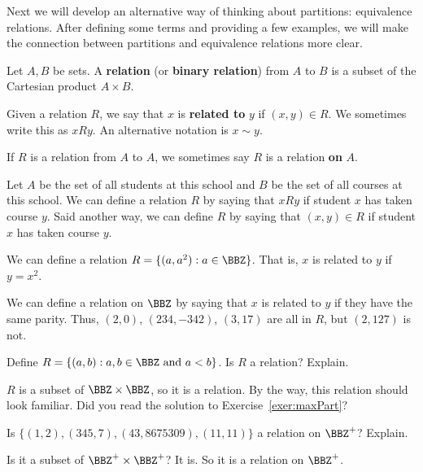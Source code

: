 Next we will develop an alternative way of thinking about partitions: equivalence relations.
After defining some terms and providing a few examples, we will make the connection between
partitions and equivalence relations more clear.
 
\begin{df}
Let $A, B$ be sets. A {\bf relation} (or {\bf binary relation}) 
from $A$ to $B$ is a subset of the Cartesian product $A\times B$.

Given a relation $R$, we say that $x$ is {\bf related to} $y$ 
if $(x, y)\in R$.  We sometimes write this as  $x  R y.$  
An alternative notation is $x\sim y$.

If $R$ is a relation from $A$ to $A$, we sometimes say $R$ is a relation {\bf on} $A$.
\end{df}

\begin{exa}
Let $A$ be the set of all students at this school and $B$ be the set of all courses at this school.
We can define a relation $R$ by saying that $x R y$ if student $x$ has taken course $y$.
Said another way, 
we can define $R$ by saying that $(x,y)\in R$ if student $x$ has taken course $y$.
\end{exa}


\begin{exa}
We can define a relation $R=\{(a,a^2) : a\in \BBZ\}$.
That is, $x$ is related to $y$ if $y=x^2$.
\end{exa}

\begin{exa}\label{exa:parityRelation}
We can define a relation on $\BBZ$ by saying that $x$ is related to $y$ if they have the same parity.
Thus, $(2,0)$, $(234,-342)$, $(3,17)$ are all in $R$, but $(2,127)$ is not.
\end{exa}

\begin{ques}
Define $R=\{(a,b) : a,b\in \BBZ \mbox{ and } a<b\}$.  Is $R$ a relation?  Explain.

\noindent
\answerlinetwo
\begin{answer}
$R$ is a subset of $\BBZ\times\BBZ$, so it is a relation.
By the way, this relation should look familiar.  
Did you read the solution to Exercise~\ref{exer:maxPart}?
\end{answer}
\end{ques}

\begin{ques}
Is $\{(1,2),(345,7), (43,8675309), (11,11)\}$ a relation on $\BBZ^+$?  Explain.

\noindent
\answerlinetwo
\begin{answer}
Is it a subset of $\BBZ^+\times\BBZ^+$?  It is.  So it is a relation on $\BBZ^+$.
\end{answer}
\end{ques}

